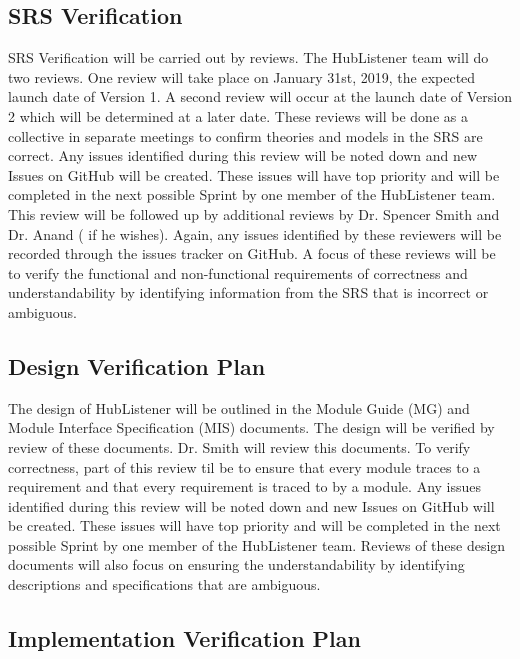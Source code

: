 \documentclass[12pt, titlepage]{article}
\begin{document}
\subsection{SRS Verification}

SRS Verification will be carried out by reviews. The HubListener team will do two reviews. One review will take place on January 31st, 2019, the expected launch date of Version 1. A second review will occur at the launch date of Version 2 which will be determined at a later date. These reviews will be done as a collective in separate meetings to confirm theories and models in the SRS are correct. Any issues identified during this review will be noted down and new Issues on GitHub will be created. These issues will have top priority and will be completed in the next possible Sprint by one member of the HubListener team. This review will be followed up by additional reviews by Dr.  Spencer Smith and Dr.  Anand ( if he wishes). Again, any issues identified by these reviewers will be recorded through the issues tracker on GitHub. A focus of these reviews will be to verify the functional and non-functional requirements of correctness and understandability by identifying information from the SRS that is incorrect or ambiguous.   

\subsection{Design Verification Plan}

The design of HubListener will be outlined in the Module Guide (MG) and Module Interface Specification (MIS) documents. The design will be verified by review of these documents. Dr.  Smith will review this documents. To verify correctness, part of this review til be to ensure that every module traces to a requirement and that every requirement is traced to by a module. Any issues identified during this review will be noted down and new Issues on GitHub will be created. These issues will have top priority and will be completed in the next possible Sprint by one member of the HubListener team. Reviews of these design documents will also focus on ensuring the understandability  by identifying descriptions and specifications that are ambiguous. 

\subsection{Implementation Verification Plan}
\end{document}
